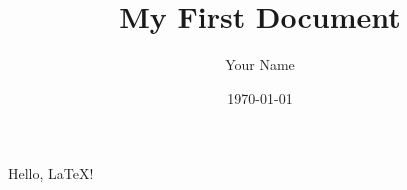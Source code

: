\documentclass{article}
\title{My First Document}
\author{Your Name}
\date{\today}
\begin{document}
\maketitle
Hello, LaTeX!
\end{document}
